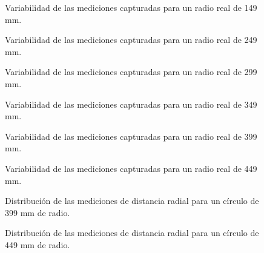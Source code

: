 \begin{figure}[H]
	\centering
	\caption{Variabilidad de las mediciones capturadas para un radio real de 149 mm.}
	\label{fig:lecturas2}
\end{figure}

\begin{figure}[H]
	\centering
	\caption{Variabilidad de las mediciones capturadas para un radio real de 249 mm.}
	\label{fig:lecturas3}
\end{figure}

\begin{figure}[H]
	\centering
	\caption{Variabilidad de las mediciones capturadas para un radio real de 299 mm.}
	\label{fig:lecturas4}
\end{figure}

\begin{figure}[H]
	\centering
	\caption{Variabilidad de las mediciones capturadas para un radio real de 349 mm.}
	\label{fig:lecturas5}
\end{figure}

\begin{figure}[H]
	\centering
	\caption{Variabilidad de las mediciones capturadas para un radio real de 399 mm.}
	\label{fig:lecturas6}
\end{figure}

\begin{figure}[H]
	\centering
	\caption{Variabilidad de las mediciones capturadas para un radio real de 449 mm.}
	\label{fig:lecturas7}
\end{figure}


\begin{figure}[H]
	\centering
	\caption{Distribución de las mediciones de distancia radial para un círculo de 399 mm de radio.}
	\label{fig:histograma_dists6}
\end{figure}

\begin{figure}[H]
	\centering
	\caption{Distribución de las mediciones de distancia radial para un círculo de 449 mm de radio.}
	\label{fig:histograma_dists7}
\end{figure}

